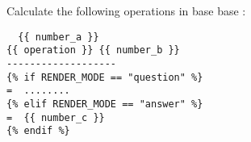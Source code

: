 Calculate  the following operations in base {{ base }} : \hfill{}

\begin{verbatim}
  {{ number_a }}
{{ operation }} {{ number_b }}
-------------------
{% if RENDER_MODE == "question" %}
=  ........
{% elif RENDER_MODE == "answer" %}
=  {{ number_c }}
{% endif %}
\end{verbatim}

